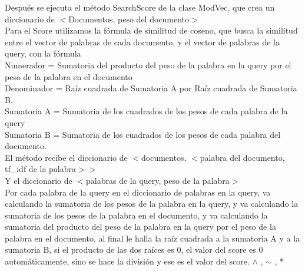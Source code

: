 \documentclass[12pt, a4paper]{article}
\begin{document}
\begin{enumerate}
\begin{itemize}
                        Después se ejecuta el método SearchScore de la clase ModVec,
                        que crea un diccionario de $<$Documentos, peso del documento$>$ \\
                        Para el Score utilizamos la fórmula de similitud de coseno, que busca la similitud
                        entre el vector de palabras de cada documento, y el vector de palabras de la query,
                        con la fórmula\\
                        Numerador = Sumatoria del producto del peso de la palabra en la query por el peso de
                        la palabra en el documento\\
                        Denominador = Raíz cuadrada de Sumatoria A por Raíz cuadrada de Sumatoria B.\\
                        Sumatoria A = Sumatoria de los cuadrados de los pesos de cada palabra de la query\\
                        Sumatoria B = Sumatoria de los cuadrados de los pesos de cada palabra del documento.\\
                        El método recibe el diccionario de $<$documentos, $<$palabra del documento, tf\_idf de la palabra$>>$\\
                        Y el diccionario de $<$palabras de la query, peso de la palabra$>$\\
                        Por cada palabra de la query en el diccionario de palabras en la query,
                        va calculando la sumatoria de los pesos de la palabra en la query,
                        y va calculando la sumatoria de los pesos de la palabra en el documento, y
                        va calculando la sumatoria del producto del peso de la palabra en la query por
                        el peso de la palabra en el documento, al final le halla la raíz cuadrada a
                        la sumatoria A y a la sumatoria B, si el producto de las dos raíces es 0,
                        el valor del score es 0 automáticamente, sino se hace la división y
                        ese es el valor del score.
                        $\wedge$ , $\sim$ , *


\end{itemize}
\end{enumerate}
\end{document}
